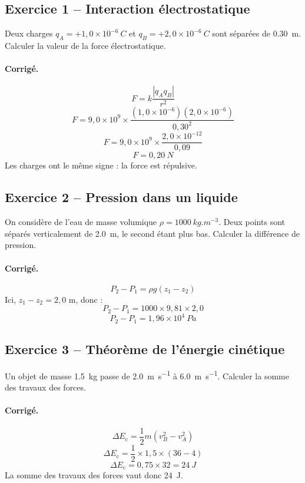 \documentclass[11pt,a4paper]{article}
\newcommand{\Ec}{E_\mathrm{c}}
\begin{document}
\subsection*{Exercice 1 -- Interaction électrostatique}

Deux charges $q_A=+1,0\times10^{-6}\ \si{C}$ et $q_B=+2,0\times10^{-6}\ \si{C}$ sont séparées de \SI{0,30}{m}.  
Calculer la valeur de la force électrostatique.

\paragraph{Corrigé.}
\[
F=k\frac{|q_Aq_B|}{r^2}
\]
\[
F=9,0\times10^9\times \frac{(1,0\times10^{-6})(2,0\times10^{-6})}{0,30^2}
\]
\[
F=9,0\times10^9\times \frac{2,0\times10^{-12}}{0,09}
\]
\[
F=0,20\ \si{N}
\]
Les charges ont le même signe : la force est répulsive.

\subsection*{Exercice 2 -- Pression dans un liquide}

On considère de l'eau de masse volumique $\rho=\SI{1000}{kg.m^{-3}}$.  
Deux points sont séparés verticalement de \SI{2,0}{m}, le second étant plus bas.  
Calculer la différence de pression.

\paragraph{Corrigé.}
\[
P_2-P_1=\rho g(z_1-z_2)
\]
Ici, $z_1-z_2=2,0$ m, donc :
\[
P_2-P_1=1000\times 9,81\times 2,0
\]
\[
P_2-P_1=1,96\times10^4\ \si{Pa}
\]

\subsection*{Exercice 3 -- Théorème de l'énergie cinétique}

Un objet de masse \SI{1,5}{kg} passe de \SI{2,0}{m.s^{-1}} à \SI{6,0}{m.s^{-1}}.  
Calculer la somme des travaux des forces.

\paragraph{Corrigé.}
\[
\Delta \Ec = \frac12 m(v_B^2-v_A^2)
\]
\[
\Delta \Ec=\frac12\times1,5\times(36-4)
\]
\[
\Delta \Ec=0,75\times 32 = 24\ \si{J}
\]
La somme des travaux des forces vaut donc \SI{24}{J}.
\end{document}
